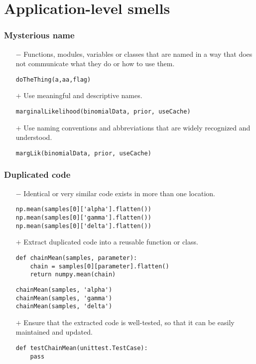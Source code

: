 \documentclass{beamer}
\begin{document}
\section{Application-level smells}

\begin{frame}[fragile]
\frametitle{Mysterious name}
\begin{itemize}
\item[$-$] Functions, modules, variables or classes that are named in a way that does not communicate what they do or how to use them.
\begin{lstlisting}[style=python]
doTheThing(a,aa,flag)
\end{lstlisting}
\item[$+$] Use meaningful and descriptive names.
\begin{lstlisting}[style=python]
marginalLikelihood(binomialData, prior, useCache)
\end{lstlisting}
\item[$+$] Use naming conventions and abbreviations that are widely recognized and understood.
\begin{lstlisting}[style=python]
margLik(binomialData, prior, useCache)
\end{lstlisting}
\end{itemize}

\end{frame}

\begin{frame}[fragile]
\frametitle{Duplicated code}

\begin{itemize}
\item[$-$] Identical or very similar code exists in more than one location.
\begin{lstlisting}[style=python]
np.mean(samples[0]['alpha'].flatten())
np.mean(samples[0]['gamma'].flatten())
np.mean(samples[0]['delta'].flatten())
\end{lstlisting}
\item[$+$] Extract duplicated code into a reusable function or class.
\begin{lstlisting}[style=python]
def chainMean(samples, parameter):
    chain = samples[0][parameter].flatten()
    return numpy.mean(chain)
\end{lstlisting}
\begin{lstlisting}[style=python]
chainMean(samples, 'alpha')
chainMean(samples, 'gamma')
chainMean(samples, 'delta')
\end{lstlisting}
\item[$+$] Ensure that the extracted code is well-tested, so that it can be easily maintained and updated.
\begin{lstlisting}[style=python]
def testChainMean(unittest.TestCase):
    pass
\end{lstlisting}
\end{itemize}

\end{frame}
\end{document}
